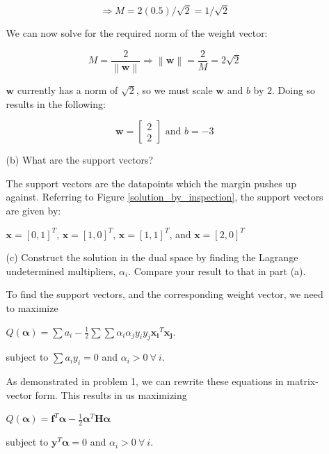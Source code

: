 \documentclass[fleqn]{article}
\newcommand{\norm}[1]{\left \lVert #1 \right \rVert}
\begin{document}
\begin{enumerate}
\begin{enumerate}
		\begin{equation*}
			\Rightarrow M = 2(0.5)/\sqrt{2} = 1/\sqrt{2} 
		\end{equation*}
		
		We can now solve for the required norm of the weight vector:
		
		\begin{equation*}
			M = \frac{2}{\norm{\mathbf{w}}} \Rightarrow \norm{\mathbf{w}} = \frac{2}{M} = 2\sqrt{2}
		\end{equation*}
		
		$\mathbf{w}$ currently has a norm of $\sqrt{2}$, so we must scale $\mathbf{w}$ and $b$ by $2$. Doing so results in the following:
		
		\begin{equation*}
			\mathbf{w} = \begin{bmatrix} 2 \\ 2 \end{bmatrix} \text{ and } b = -3
		\end{equation*}	
		
		\item[(b)] What are the support vectors?
		
		The support vectors are the datapoints which the margin pushes up against. Referring to Figure \ref{solution_by_inspection}, the support vectors are given by:
		
		$\mathbf{x} = [0, 1]^T$, $\mathbf{x} = [1, 0]^T$, $\mathbf{x} = [1, 1]^T$, and $\mathbf{x} = [2, 0]^T$
		
		\item[(c)] Construct the solution in the dual space by finding the Lagrange undetermined multipliers, $\alpha_i$. Compare your result to that in \newline part (a).
		
		To find the support vectors, and the corresponding weight vector, we need to maximize		
		
		$Q(\boldsymbol{\alpha}) = \sum{a_i} - \frac{1}{2}\sum{\sum{\alpha_i\alpha_jy_iy_j\mathbf{x_i}^T\mathbf{x_j}}}$.
	
	subject to $\sum{a_iy_i} = 0$ and $\alpha_i > 0\ \forall\ i$.
	
		As demonstrated in problem 1, we can rewrite these equations in matrix-vector form. This results in us maximizing
		
		$Q(\boldsymbol{\alpha}) = \mathbf{f}^T\boldsymbol{\alpha} - \frac{1}{2}\boldsymbol{\alpha}^T\mathbf{H}\boldsymbol{\alpha}$
		
		subject to $\mathbf{y}^T\boldsymbol{\alpha} = 0$ and $\alpha_i > 0\ \forall\ i$.
		

\end{enumerate}
\end{enumerate}
\end{document}
